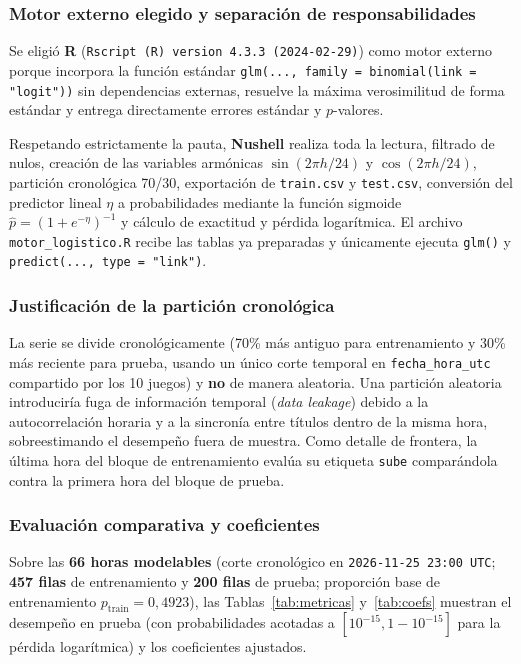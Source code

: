 \documentclass[11pt,a4paper]{article}
\begin{document}
\subsubsection{Motor externo elegido y separación de responsabilidades}
Se eligió \textbf{R} (\texttt{Rscript (R) version 4.3.3 (2024-02-29)}) como motor externo porque incorpora la función estándar \texttt{glm(..., family = binomial(link = "logit"))} sin dependencias externas, resuelve la máxima verosimilitud de forma estándar y entrega directamente errores estándar y $p$-valores.

Respetando estrictamente la pauta, \textbf{Nushell} realiza toda la lectura, filtrado de nulos, creación de las variables armónicas $\sin(2\pi h/24)$ y $\cos(2\pi h/24)$, partición cronológica 70/30, exportación de \texttt{train.csv} y \texttt{test.csv}, conversión del predictor lineal $\eta$ a probabilidades mediante la función sigmoide $\hat{p} = (1 + e^{-\eta})^{-1}$ y cálculo de exactitud y pérdida logarítmica. El archivo \texttt{motor\_logistico.R} recibe las tablas ya preparadas y únicamente ejecuta \texttt{glm()} y \texttt{predict(..., type = "link")}.

\subsubsection{Justificación de la partición cronológica}
La serie se divide cronológicamente (70\% más antiguo para entrenamiento y 30\% más reciente para prueba, usando un único corte temporal en \texttt{fecha\_hora\_utc} compartido por los 10 juegos) y \textbf{no} de manera aleatoria. Una partición aleatoria introduciría fuga de información temporal (\emph{data leakage}) debido a la autocorrelación horaria y a la sincronía entre títulos dentro de la misma hora, sobreestimando el desempeño fuera de muestra. Como detalle de frontera, la última hora del bloque de entrenamiento evalúa su etiqueta \texttt{sube} comparándola contra la primera hora del bloque de prueba.

\subsubsection{Evaluación comparativa y coeficientes}
Sobre las \textbf{66 horas modelables} (corte cronológico en \texttt{2026-11-25 23:00 UTC}; \textbf{457 filas} de entrenamiento y \textbf{200 filas} de prueba; proporción base de entrenamiento $p_{\text{train}} = 0{,}4923$), las Tablas~\ref{tab:metricas} y~\ref{tab:coefs} muestran el desempeño en prueba (con probabilidades acotadas a $[10^{-15}, 1-10^{-15}]$ para la pérdida logarítmica) y los coeficientes ajustados.
\end{document}
